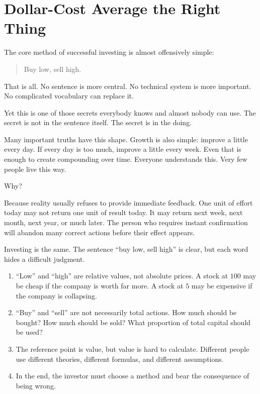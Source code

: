 \chapter{Dollar-Cost Average the Right Thing}

The core method of successful investing is almost offensively simple:

\begin{quote}
Buy low, sell high.
\end{quote}

That is all. No sentence is more central. No technical system is more important. No complicated vocabulary can replace it.

Yet this is one of those secrets everybody knows and almost nobody can use. The secret is not in the sentence itself. The secret is in the doing.

Many important truths have this shape. Growth is also simple: improve a little every day. If every day is too much, improve a little every week. Even that is enough to create compounding over time. Everyone understands this. Very few people live this way.

Why?

Because reality usually refuses to provide immediate feedback. One unit of effort today may not return one unit of result today. It may return next week, next month, next year, or much later. The person who requires instant confirmation will abandon many correct actions before their effect appears.

Investing is the same. The sentence ``buy low, sell high'' is clear, but each word hides a difficult judgment.

\begin{enumerate}
\item ``Low'' and ``high'' are relative values, not absolute prices. A stock at \(100\) may be cheap if the company is worth far more. A stock at \(5\) may be expensive if the company is collapsing.
\item ``Buy'' and ``sell'' are not necessarily total actions. How much should be bought? How much should be sold? What proportion of total capital should be used?
\item The reference point is value, but value is hard to calculate. Different people use different theories, different formulas, and different assumptions.
\item In the end, the investor must choose a method and bear the consequence of being wrong.
\end{enumerate}


